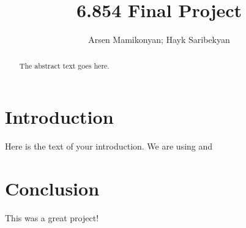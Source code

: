 \documentclass{article}
\begin{document}
\title{6.854 Final Project}
\author{Arsen Mamikonyan; Hayk Saribekyan}


\maketitle

\begin{abstract}
The abstract text goes here.
\end{abstract}

\section{Introduction}
Here is the text of your introduction.
We are using \cite{bokal_et_al:LIPIcs:2015:5113} and \cite{chan_et_al:LIPIcs:2016:5920}

\section{Conclusion}
This was a great project!



\end{document}
